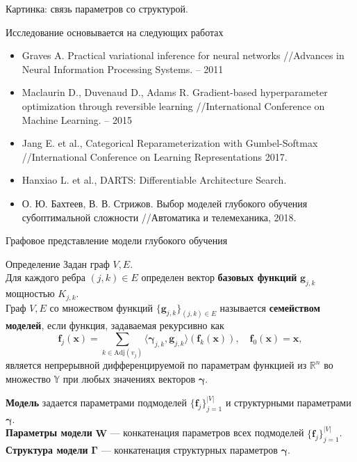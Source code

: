 \documentclass[usenames,dvipsnames,11pt,pdf,utf8,russian,aspectratio=169]{beamer}
\begin{document}
\begin{frame}{}
Картинка: связь параметров со структурой.
\end{frame}


\begin{frame}{Исследование основывается на следующих работах}
\begin{itemize}
\item Graves A. Practical variational inference for neural networks //Advances in Neural Information Processing Systems. – 2011
\item  Maclaurin D., Duvenaud D., Adams R. Gradient-based hyperparameter optimization through reversible learning //International Conference on Machine Learning. – 2015
\item Jang E. et al., Categorical Reparameterization with Gumbel-Softmax //International Conference on Learning Representations 2017. 
\item Hanxiao L. et al., DARTS: Differentiable Architecture Search.
\item О. Ю. Бахтеев, В. В. Стрижов. Выбор моделей глубокого обучения субоптимальной сложности  //Автоматика и телемеханика, 2018.
\end{itemize}
\end{frame}


\begin{frame}{Графовое представление модели глубокого обучения}
\begin{block}{Определение}
Задан граф $V,E$. \\
Для каждого ребра $(j,k) \in E$ определен вектор \textbf{базовых функций} $\mathbf{g}_{j,k}$ мощностью $K_{j,k}$.\\
Граф $V, E$ со множеством функций $\{\mathbf{g}_{j,k}\}_{(j,k) \in E}$ называется \textbf{семейством моделей}, если функция, задаваемая рекурсивно как 
\[
    \mathbf{f}_j(\mathbf{x}) = \sum_{k \in \text{Adj}(v_j)} \langle \boldsymbol{\gamma}_{j,k}, \mathbf{g}_{j,k} \rangle (\mathbf{f}_{k}(\mathbf{x})), \quad     \mathbf{f}_0(\mathbf{x}) = \mathbf{x},
\]
является непрерывной дифференцируемой по параметрам функцией из $\mathbb{R}^n$ во множество $\mathbb{Y}$ при любых значениях векторов $\boldsymbol{\gamma}$.
\end{block}
\textbf{Модель} задается параметрами подмоделей $\{\mathbf{f}_j\}_{j=1}^{|V|}$ и структурными параметрами  $\boldsymbol{\gamma}$.\\
\textbf{Параметры модели}  $\mathbf{W}$ ---  конкатенация параметров всех подмоделей $\{\mathbf{f}_j\}_{j=1}^{|V|}$.\\
\textbf{Структура модели}  $\boldsymbol{\Gamma}$ --- конкатенация структурных параметров $\boldsymbol{\gamma}$.
\end{frame}
\end{document}
